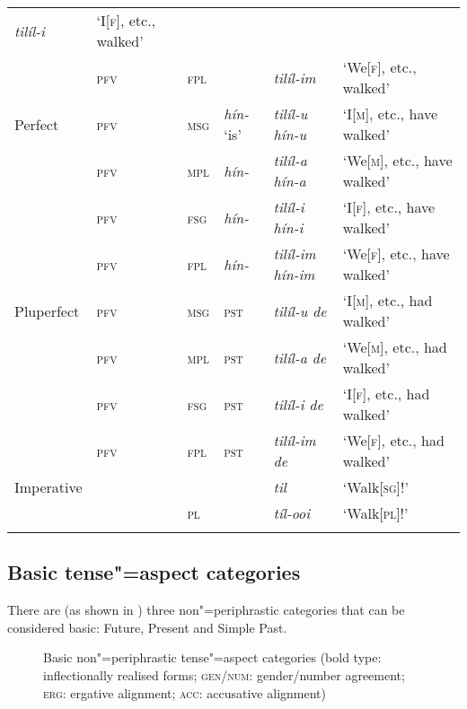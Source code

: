 \begin{table}[ht]
\begin{tabularx}{\textwidth}{ l l l l l l }
\textit{tilíl-i} &
`I[\textsc{f}], etc., walked' \\
&
\textsc{pfv} &
\textsc{fpl} &
&
\textit{tilíl-im} &
`We[\textsc{f}], etc., walked' \\
Perfect &
\textsc{pfv} &
\textsc{msg} &
\textit{hín-} `is' &
\textit{tilíl-u hín-u} &
`I[\textsc{m}], etc., have walked' \\
&
\textsc{pfv} &
\textsc{mpl} &
\textit{hín-} &
\textit{tilíl-a hín-a} &
`We[\textsc{m}], etc., have walked' \\
&
\textsc{pfv} &
\textsc{fsg} &
\textit{hín-} &
\textit{tilíl-i hín-i} &
`I[\textsc{f}], etc., have walked' \\
&
\textsc{pfv} &
\textsc{fpl} &
\textit{hín-} &
\textit{tilíl-im hín-im} &
`We[\textsc{f}], etc., have walked' \\
Pluperfect &
\textsc{pfv} &
\textsc{msg} &
\textsc{pst} &
\textit{tilíl-u de} &
`I[\textsc{m}], etc., had walked' \\
&
\textsc{pfv} &
\textsc{mpl} &
\textsc{pst} &
\textit{tilíl-a de} &
`We[\textsc{m}], etc., had walked' \\
&
\textsc{pfv} &
\textsc{fsg} &
\textsc{pst} &
\textit{tilíl-i de} &
`I[\textsc{f}], etc., had walked' \\
&
\textsc{pfv} &
\textsc{fpl} &
\textsc{pst} &
\textit{tilíl-im de} &
`We[\textsc{f}], etc., had walked' \\
Imperative &
&
&
&
\textit{til} &
`Walk[\textsc{sg}]!' \\
&
&
\textsc{pl} &
&
\textit{tíl-ooi} &
`Walk[\textsc{pl}]!' 
\\\lspbottomrule
\end{tabularx}
\label{tab:9-1b}
\end{table}


\subsection{Basic tense"=aspect categories}
\label{subsec:9-1-1}


There are (as shown in ) three non"=periphrastic categories that can be considered basic: Future, Present and Simple Past.

\begin{figure}[ht]
\centering
{}
\caption{Basic non"=periphrastic tense"=aspect categories (bold type: inflectionally realised forms;
    \textsc{gen/num}: gender/number agreement; \textsc{erg}: ergative alignment; \textsc{acc}:
    accusative alignment)}
\label{fig:9-1}
\end{figure}

